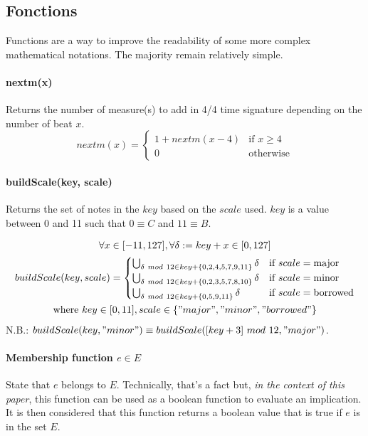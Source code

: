 \subsection{Fonctions}
Functions are a way to improve the readability of some more complex mathematical notations. The majority remain relatively simple.
\paragraph{nextm(x)} Returns the number of measure(s) to add in 4/4 time signature depending on the number of beat $x$.
\begin{equation}
    nextm(x) = \begin{cases}
        1 + nextm(x-4)& \text{if } x \geq 4\\
        0 & \text{otherwise}
    \end{cases}
    \label{eq:nextm}
\end{equation}

\paragraph{buildScale(key, scale)} Returns the set of notes in the $key$ based on the $scale$ used. $key$ is a value between 0 and 11 such that $0 \equiv C$ and $11 \equiv B$.

\begin{equation}
    \begin{gathered}
        \forall x \in [-11, 127], \forall \delta := key+x \in [0, 127]\\
        buildScale(key, scale) = \begin{cases}
            \bigcup _{\delta\ mod\ 12 \in key + \{0, 2, 4, 5, 7, 9, 11\}} \delta & \text{if } scale = \text{major}\\
            \bigcup _{\delta\ mod\ 12 \in key + \{0, 2, 3, 5, 7, 8, 10\}} \delta & \text{if } scale = \text{minor}\\
            \bigcup _{\delta\ mod\ 12 \in key + \{0, 5, 9, 11\}} \delta & \text{if } scale = \text{borrowed}
        \end{cases}\\
        \text{where } key \in [0, 11], scale \in \{"major", "minor", "borrowed"\}
    \end{gathered}
    \label{eq:buildScale}
\end{equation}
N.B.: $buildScale(key, "minor") \equiv buildScale([key+3]\ mod\ 12, "major")$.

\paragraph{Membership function $e \in E$} State that $e$ belongs to $E$. Technically, that's a fact but, \emph{in the context of this paper}, this function can be used as a boolean function to evaluate an implication. It is then considered that this function returns a boolean value that is true if $e$ is in the set $E$.

